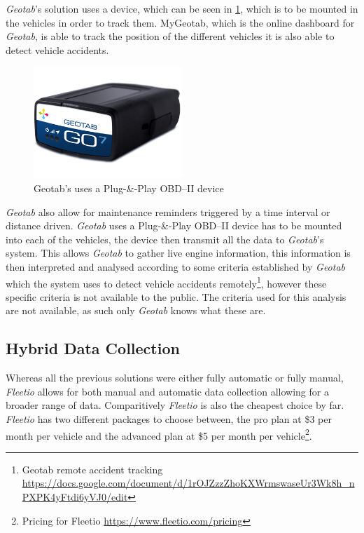 \textit{Geotab}'s solution uses a device, which can be seen in \cref{fig:Geotab_device}, which is to be mounted in the vehicles in order to track them. MyGeotab, which is the online dashboard for \textit{Geotab}, is able to track the position of the different vehicles it is also able to detect vehicle accidents\cite{geotab}.
\begin{figure}[h!]
    \centering
    \includegraphics[width=0.5\textwidth]{img/geotab-device-side-view.png}
    \caption{Geotab's uses a Plug-\&-Play OBD--II device}
    \label{fig:Geotab_device}
\end{figure}

\textit{Geotab} also allow for maintenance reminders triggered by a time interval or distance driven.
\textit{Geotab} uses a Plug-\&-Play OBD--II device has to be mounted into each of the vehicles, the device then transmit all the data to \textit{Geotab}'s system.
This allows \textit{Geotab} to gather live engine information, this information is then interpreted and analysed according to some criteria established by \textit{Geotab} which the system uses to detect vehicle accidents remotely\footnote{Geotab remote accident tracking \url{https://docs.google.com/document/d/1rOJZzzZhoKXWrmswaseUr3Wk8h_nPXPK4yFtdi6yVJ0/edit}}, however these specific criteria is not available to the public.
The criteria used for this analysis are not available, as such only \textit{Geotab} knows what these are.
\subsection{Hybrid Data Collection}
Whereas all the previous solutions were either fully automatic or fully manual, \textit{Fleetio} allows for both manual and automatic data collection allowing for a broader range of data.
Comparitively \textit{Fleetio} is also the cheapest choice by far. 
\textit{Fleetio} has two different packages to choose between, the pro plan at \$3 per month per vehicle and the advanced plan at \$5 per month per vehicle\footnote{Pricing for Fleetio \url{https://www.fleetio.com/pricing}}.
